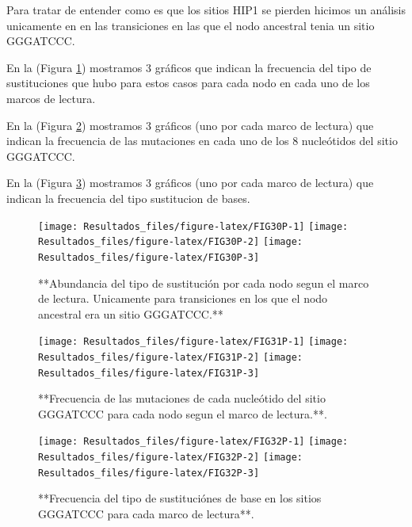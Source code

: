 \documentclass[
]{book}
\begin{document}
Para tratar de entender como es que los sitios HIP1 se pierden hicimos un análisis unicamente en en las transiciones en las que el nodo ancestral tenia un sitio GGGATCCC.

En la (Figura \ref{fig:FIG30P}) mostramos 3 gráficos que indican la frecuencia del tipo de sustituciones que hubo para estos casos para cada nodo en cada uno de los marcos de lectura.

En la (Figura \ref{fig:FIG31P}) mostramos 3 gráficos (uno por cada marco de lectura) que indican la frecuencia de las mutaciones en cada uno de los 8 nucleótidos del sitio GGGATCCC.

En la (Figura \ref{fig:FIG32P}) mostramos 3 gráficos (uno por cada marco de lectura) que indican la frecuencia del tipo sustitucion de bases.

\begin{figure}

{\centering \texttt{[image: Resultados\_files/figure-latex/FIG30P-1]} \texttt{[image: Resultados\_files/figure-latex/FIG30P-2]} \texttt{[image: Resultados\_files/figure-latex/FIG30P-3]} 

}

\caption{**Abundancia del tipo de sustitución por cada nodo segun el marco de lectura. Unicamente para transiciones en los que el nodo ancestral era un sitio GGGATCCC.**}\label{fig:FIG30P}
\end{figure}

\begin{figure}

{\centering \texttt{[image: Resultados\_files/figure-latex/FIG31P-1]} \texttt{[image: Resultados\_files/figure-latex/FIG31P-2]} \texttt{[image: Resultados\_files/figure-latex/FIG31P-3]} 

}

\caption{**Frecuencia de las mutaciones de cada nucleótido del sitio GGGATCCC para cada nodo segun el marco de lectura.**.}\label{fig:FIG31P}
\end{figure}

\begin{figure}

{\centering \texttt{[image: Resultados\_files/figure-latex/FIG32P-1]} \texttt{[image: Resultados\_files/figure-latex/FIG32P-2]} \texttt{[image: Resultados\_files/figure-latex/FIG32P-3]} 

}

\caption{**Frecuencia del tipo de sustituciónes de base en los sitios GGGATCCC para cada marco de lectura**.}\label{fig:FIG32P}
\end{figure}
\end{document}
